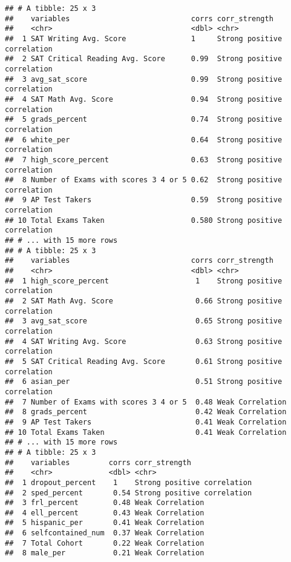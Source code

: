 \documentclass[]{article}
\begin{document}
\begin{verbatim}
## # A tibble: 25 x 3
##    variables                            corrs corr_strength              
##    <chr>                                <dbl> <chr>                      
##  1 SAT Writing Avg. Score               1     Strong positive correlation
##  2 SAT Critical Reading Avg. Score      0.99  Strong positive correlation
##  3 avg_sat_score                        0.99  Strong positive correlation
##  4 SAT Math Avg. Score                  0.94  Strong positive correlation
##  5 grads_percent                        0.74  Strong positive correlation
##  6 white_per                            0.64  Strong positive correlation
##  7 high_score_percent                   0.63  Strong positive correlation
##  8 Number of Exams with scores 3 4 or 5 0.62  Strong positive correlation
##  9 AP Test Takers                       0.59  Strong positive correlation
## 10 Total Exams Taken                    0.580 Strong positive correlation
## # ... with 15 more rows
## # A tibble: 25 x 3
##    variables                            corrs corr_strength              
##    <chr>                                <dbl> <chr>                      
##  1 high_score_percent                    1    Strong positive correlation
##  2 SAT Math Avg. Score                   0.66 Strong positive correlation
##  3 avg_sat_score                         0.65 Strong positive correlation
##  4 SAT Writing Avg. Score                0.63 Strong positive correlation
##  5 SAT Critical Reading Avg. Score       0.61 Strong positive correlation
##  6 asian_per                             0.51 Strong positive correlation
##  7 Number of Exams with scores 3 4 or 5  0.48 Weak Correlation           
##  8 grads_percent                         0.42 Weak Correlation           
##  9 AP Test Takers                        0.41 Weak Correlation           
## 10 Total Exams Taken                     0.41 Weak Correlation           
## # ... with 15 more rows
## # A tibble: 25 x 3
##    variables         corrs corr_strength              
##    <chr>             <dbl> <chr>                      
##  1 dropout_percent    1    Strong positive correlation
##  2 sped_percent       0.54 Strong positive correlation
##  3 frl_percent        0.48 Weak Correlation           
##  4 ell_percent        0.43 Weak Correlation           
##  5 hispanic_per       0.41 Weak Correlation           
##  6 selfcontained_num  0.37 Weak Correlation           
##  7 Total Cohort       0.22 Weak Correlation           
##  8 male_per           0.21 Weak Correlation           

\end{verbatim}
\end{document}
